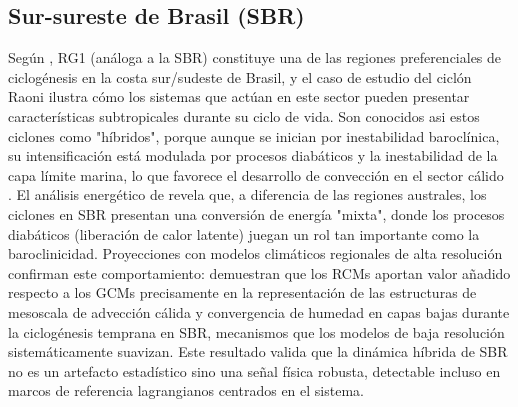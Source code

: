 \subsection{Sur-sureste de Brasil (SBR)}\label{subsec:tb_sbr}
Según \citet{reboita2022from}, RG1 (análoga a la SBR) constituye una de las regiones preferenciales de ciclogénesis en la costa sur/sudeste de Brasil, y el caso de estudio del ciclón Raoni ilustra cómo los sistemas que actúan en este sector pueden presentar características subtropicales durante su ciclo de vida. Son conocidos asi estos ciclones como "híbridos", porque aunque se inician por inestabilidad baroclínica, su intensificación está modulada por procesos diabáticos y la inestabilidad de la capa límite marina, lo que favorece el desarrollo de convección en el sector cálido \citep{marrafon2022classificacao}. 
El análisis energético de \citet{coutodesouza2024thesis} revela que, a diferencia de las regiones australes, los ciclones en SBR presentan una conversión de energía "mixta", donde los procesos diabáticos (liberación de calor latente) juegan un rol tan importante como la baroclinicidad.
Proyecciones con modelos climáticos regionales de alta resolución confirman este comportamiento: \citet{gramcianinov2024early} demuestran que los RCMs aportan valor añadido respecto a los GCMs precisamente en la representación de las estructuras de mesoscala de advección cálida y convergencia de humedad en capas bajas durante la ciclogénesis temprana en SBR, mecanismos que los modelos de baja resolución sistemáticamente suavizan. Este resultado valida que la dinámica híbrida de SBR no es un artefacto estadístico sino una señal física robusta, detectable incluso en marcos de referencia lagrangianos centrados en el sistema.


